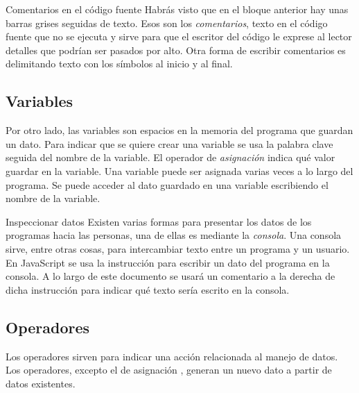 \documentclass{article}
\newcommand{\code}[1]{\tcbox{\texttt{#1}}}
\newcommand{\codejs}[1]{\tcbox{\lstinline[style=ES6]{#1}}}
\begin{document}


\begin{bclogo}[logo=\bcinfo, couleurBarre=orange, noborder=true, couleur=white]{Comentarios en el código fuente}
Habrás visto que en el bloque anterior hay unas barras grises \code{//} seguidas de texto. Esos son los \textit{comentarios}, texto en el código fuente que no se ejecuta y sirve para que el escritor del código le exprese al lector detalles que podrían ser pasados por alto.
\newline
Otra forma de escribir comentarios es delimitando texto con los símbolos \code{/*} al inicio y \code{*/} al final.
\end{bclogo}

\subsection{Variables}
Por otro lado, las variables son espacios en la memoria del programa que guardan un dato. Para indicar que se quiere crear una variable se usa la palabra clave \codejs{let} seguida del nombre de la variable. El operador de \textit{asignación} \codejs{=} indica qué valor guardar en la variable. Una variable puede ser asignada varias veces a lo largo del programa. Se puede acceder al dato guardado en una variable escribiendo el nombre de la variable.



\begin{bclogo}[logo=\bcinfo, couleurBarre=orange, noborder=true, couleur=white]{Inspeccionar datos}
Existen varias formas para presentar los datos de los programas hacia las personas, una de ellas es mediante la \textit{consola}. Una consola sirve, entre otras cosas, para intercambiar texto entre un programa y un usuario. En JavaScript se usa la instrucción \codejs{console.log( /* dato */ )} para escribir un dato del programa en la consola. A lo largo de este documento se usará un comentario a la derecha de dicha instrucción para indicar qué texto sería escrito en la consola.
\end{bclogo}

\subsection{Operadores}
Los operadores sirven para indicar una acción relacionada al manejo de datos. Los operadores, excepto el de asignación \code{=}, generan un nuevo dato a partir de datos existentes.
\end{document}
